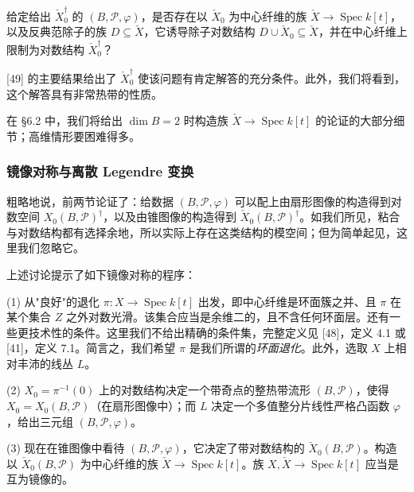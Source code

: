 \begin{question}
给定给出 $\check X_0^{\dagger}$ 的 $(B,\mathcal{P},\varphi)$，是否存在以 $\check X_0$ 为中心纤维的族 $\check X\to\operatorname{Spec} k[t]$，以及反典范除子的族 $D\subseteq\check X$，它诱导除子对数结构 $D\cup\check X_0\subseteq\check X$，并在中心纤维上限制为对数结构 $\check X_0^{\dagger}$？
\end{question}

[49] 的主要结果给出了 $\check X_0^{\dagger}$ 使该问题有肯定解答的充分条件。此外，我们将看到，这个解答具有非常热带的性质。

在 §6.2 中，我们将给出 $\dim B=2$ 时构造族 $\check X\to\operatorname{Spec} k[t]$ 的论证的大部分细节；高维情形要困难得多。


\subsubsection{镜像对称与离散 Legendre 变换}

粗略地说，前两节论证了：给数据 $(B,\mathcal{P},\varphi)$ 可以配上由扇形图像的构造得到对数空间 $X_0(B,\mathcal{P})^{\dagger}$，以及由锥图像的构造得到 $\check X_0(B,\mathcal{P})^{\dagger}$。如我们所见，粘合与对数结构都有选择余地，所以实际上存在这类结构的模空间；但为简单起见，这里我们忽略它。

上述讨论提示了如下镜像对称的程序：

(1) 从"良好"的退化 $\pi:X\to\operatorname{Spec} k[t]$ 出发，即中心纤维是环面簇之并、且 $\pi$ 在某个集合 $Z$ 之外对数光滑。该集合应当是余维二的，且不含任何环面层。还有一些更技术性的条件。这里我们不给出精确的条件集，完整定义见 [48]，定义 4.1 或 [41]，定义 7.1。简言之，我们希望 $\pi$ 是我们所谓的\emph{环面退化}。此外，选取 $X$ 上相对丰沛的线丛 $L$。

(2) $X_0=\pi^{-1}(0)$ 上的对数结构决定一个带奇点的整热带流形 $(B,\mathcal{P})$，使得 $X_0=X_0(B,\mathcal{P})$（在扇形图像中）；而 $L$ 决定一个多值整分片线性严格凸函数 $\varphi$，给出三元组 $(B,\mathcal{P},\varphi)$。

(3) 现在在锥图像中看待 $(B,\mathcal{P},\varphi)$，它决定了带对数结构的 $\check X_0(B,\mathcal{P})$。构造以 $\check X_0(B,\mathcal{P})$ 为中心纤维的族 $\check X\to\operatorname{Spec} k[t]$。族 $X,\check X\to\operatorname{Spec} k[t]$ 应当是互为镜像的。

